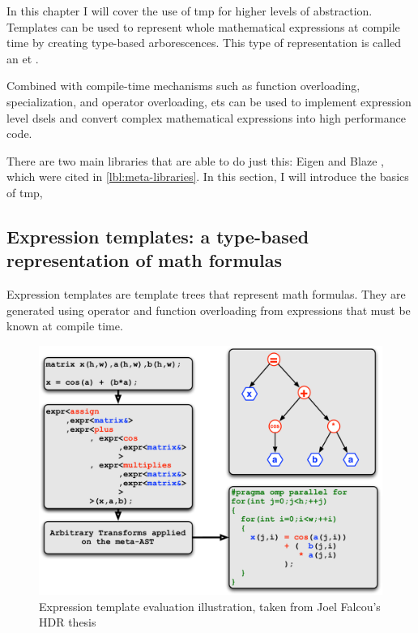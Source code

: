 \documentclass[../main]{subfiles}
\begin{document}
In this chapter I will cover the use of \gls{tmp} for higher levels
of abstraction. Templates can be used to represent whole mathematical
expressions at compile time by creating type-based arborescences.
This type of representation is called an \gls{et} \cite{veldhuizen:1995}.

Combined with compile-time mechanisms such as function overloading,
specialization, and operator overloading, \glspl{et} can be used to
implement expression level \glspl{dsel} and convert complex
mathematical expressions into high performance code.

There are two main libraries that are able to do just this: Eigen \cite{eigen}
and Blaze \cite{blazelib}, which were cited in \ref{lbl:meta-libraries}.
In this section, I will introduce the basics of \cpp \gls{tmp},

\subsection{
  Expression templates: a type-based representation of math formulas
}

Expression templates are template trees that represent math formulas.
They are generated using operator and function overloading from expressions
that must be known at compile time.

\begin{figure}[h]
\includegraphics[width=\textwidth]{images/expressiontemplates.pdf}
\caption{
  Expression template evaluation illustration,
  taken from Joel Falcou's HDR thesis \cite{falcou-hdr}
}
\label{fig:expression-template-illustration}
\end{figure}
\end{document}
